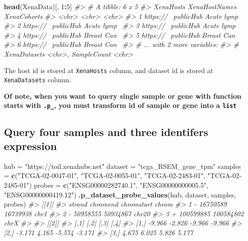 \documentclass[nofonts,]{tufte-handout}
\newenvironment{Shaded}{\begin{snugshade}}{\end{snugshade}}
\newcommand{\CommentTok}[1]{\textcolor[rgb]{0.56,0.35,0.01}{\textit{#1}}}
\newcommand{\DecValTok}[1]{\textcolor[rgb]{0.00,0.00,0.81}{#1}}
\newcommand{\KeywordTok}[1]{\textcolor[rgb]{0.13,0.29,0.53}{\textbf{#1}}}
\newcommand{\NormalTok}[1]{#1}
\newcommand{\OperatorTok}[1]{\textcolor[rgb]{0.81,0.36,0.00}{\textbf{#1}}}
\newcommand{\StringTok}[1]{\textcolor[rgb]{0.31,0.60,0.02}{#1}}
\begin{document}
\begin{Shaded}
\begin{Highlighting}[]
\KeywordTok{head}\NormalTok{(XenaData)[, }\DecValTok{1}\OperatorTok{:}\DecValTok{5}\NormalTok{]}
\CommentTok{#> # A tibble: 6 x 5}
\CommentTok{#>   XenaHosts XenaHostNames XenaCohorts}
\CommentTok{#>   <chr>     <chr>         <chr>      }
\CommentTok{#> 1 https://~ publicHub     Acute lymp~}
\CommentTok{#> 2 https://~ publicHub     Acute lymp~}
\CommentTok{#> 3 https://~ publicHub     Acute lymp~}
\CommentTok{#> 4 https://~ publicHub     Breast Can~}
\CommentTok{#> 5 https://~ publicHub     Breast Can~}
\CommentTok{#> 6 https://~ publicHub     Breast Can~}
\CommentTok{#> # ... with 2 more variables:}
\CommentTok{#> #   XenaDatasets <chr>, SampleCount <chr>}
\end{Highlighting}
\end{Shaded}

The host id is stored at \texttt{XenaHosts} column, and dataset id is
stored at \texttt{XenaDatasets} column.

\textbf{Of note, when you want to query single sample or gene with
function starts with \texttt{.p\_}, you must transform id of sample or
gene into a \texttt{list}}

\hypertarget{query-four-samples-and-three-identifers-expression}{%
\subsection{Query four samples and three identifers
expression}\label{query-four-samples-and-three-identifers-expression}}

\begin{Shaded}
\begin{Highlighting}[]
\NormalTok{hub =}\StringTok{ "https://toil.xenahubs.net"}
\NormalTok{dataset =}\StringTok{ "tcga_RSEM_gene_tpm"}
\NormalTok{samples =}\StringTok{ }\KeywordTok{c}\NormalTok{(}\StringTok{"TCGA-02-0047-01"}\NormalTok{, }\StringTok{"TCGA-02-0055-01"}\NormalTok{, }
    \StringTok{"TCGA-02-2483-01"}\NormalTok{, }\StringTok{"TCGA-02-2485-01"}\NormalTok{)}
\NormalTok{probes =}\StringTok{ }\KeywordTok{c}\NormalTok{(}\StringTok{"ENSG00000282740.1"}\NormalTok{, }\StringTok{"ENSG00000000005.5"}\NormalTok{, }
    \StringTok{"ENSG00000000419.12"}\NormalTok{)}
\KeywordTok{.p_dataset_probe_values}\NormalTok{(hub, dataset, samples, }
\NormalTok{    probes)}
\CommentTok{#> [[1]]}
\CommentTok{#>   strand  chromend chromstart chrom}
\CommentTok{#> 1      -  16750589   16739938  chr1}
\CommentTok{#> 2      -  50958555   50934867 chr20}
\CommentTok{#> 3      + 100599885  100584802  chrX}
\CommentTok{#> }
\CommentTok{#> [[2]]}
\CommentTok{#>        [,1]   [,2]   [,3]   [,4]}
\CommentTok{#> [1,] -9.966 -2.826 -9.966 -9.966}
\CommentTok{#> [2,] -3.171  4.165 -5.574 -3.171}
\CommentTok{#> [3,]  4.675  6.025  5.826  5.177}
\end{Highlighting}
\end{Shaded}
\end{document}
